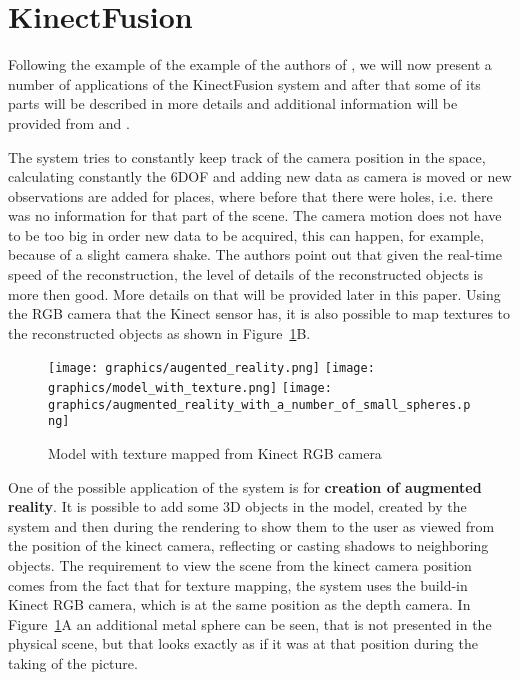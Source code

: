\documentclass[12pt, a4paper]{article}
\theoremstyle{plain}
\begin{document}
\section{KinectFusion} %
\label{sec:KinectFusion}
  Following the example of the example of the authors of \cite{kinectfusion}, we
  will now present a number of applications of the KinectFusion system and after
  that some of its parts will be described in more details and additional
  information will be provided from
  \cite{representaion-and-rendering-of-implicit-surfaces} and \cite{icp}.

  The system tries to constantly keep track of the camera position in the space,
  calculating constantly the 6DOF and adding new data as camera is moved or new
  observations are added for places, where before that there were holes, i.e.
  there was no information for that part of the scene. The camera motion does
  not have to be too big in order new data to be acquired, this can happen, for
  example, because of a slight camera shake. The authors point out that given
  the real-time speed of the reconstruction, the level of details of the
  reconstructed objects is more then good. More details on that will be provided
  later in this paper. Using the RGB camera that the Kinect sensor has, it is
  also possible to map textures to the reconstructed objects as shown in
  Figure~\ref{fig:model_with_texture}B.

  \begin{figure}[h]
    \centering
    \texttt{[image: graphics/augented\_reality.png]}
    \texttt{[image: graphics/model\_with\_texture.png]}
    \texttt{[image: graphics/augmented\_reality\_with\_a\_number\_of\_small\_spheres.png]}
    \caption{Model with texture mapped from Kinect RGB camera}
    \label{fig:model_with_texture}
  \end{figure}

  One of the possible application of the system is for \textbf{creation of
  augmented reality}. It is possible to add some 3D objects in the model,
  created by the system and then during the rendering to show them to the user
  as viewed from the position of the kinect camera, reflecting or casting
  shadows to neighboring objects. The requirement to view the scene from the
  kinect camera position comes from the fact that for texture mapping, the
  system uses the build-in Kinect RGB camera, which is at the same position as
  the depth camera.  In Figure~\ref{fig:model_with_texture}A an additional metal
  sphere can be seen, that is not presented in the physical scene, but that
  looks exactly as if it was at that position during the taking of the picture.
\end{document}
